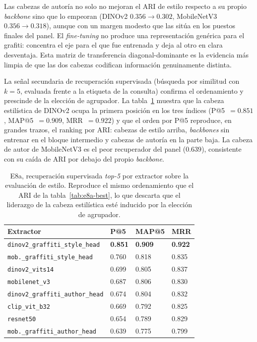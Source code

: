 Las cabezas de autoría no solo no mejoran el ARI de estilo respecto a su
propio \textit{backbone} sino que lo empeoran (DINOv2 $0.356\to 0.302$, MobileNetV3
$0.356\to 0.318$), aunque con un margen modesto que las sitúa en los puestos
finales del panel. El \textit{fine-tuning} no produce una representación
genérica para el grafiti: concentra el eje para el que fue entrenada y deja al
otro en clara desventaja. Esta matriz de transferencia diagonal-dominante es la
evidencia más limpia de que las dos cabezas codifican información genuinamente
distinta.

La señal secundaria de recuperación supervisada (búsqueda por similitud con
$k=5$, evaluada frente a la etiqueta de la consulta) confirma el ordenamiento
y prescinde de la elección de agrupador. La tabla~\ref{tab:e8a-retrieval}
muestra que la cabeza estilística de DINOv2 ocupa la primera posición en los
tres índices (P@5~$=0.851$, MAP@5~$=0.909$, MRR~$=0.922$) y que el orden por
P@5 reproduce, en grandes trazos, el ranking por ARI: cabezas de estilo
arriba, \textit{backbones} sin entrenar en el bloque intermedio y cabezas de
autoría en la parte baja. La cabeza de autor de MobileNetV3 es el peor
recuperador del panel ($0.639$), consistente con su caída de ARI por debajo
del propio \textit{backbone}.

\begin{table}[h]
  \centering
{\footnotesize
\begin{tabular}{|p{5.4cm}|p{1.3cm}|p{1.6cm}|p{1.3cm}|} \hline
  \textbf{Extractor} & \textbf{P@5} & \textbf{MAP@5} & \textbf{MRR} \\ \hline
  \texttt{dinov2\_graffiti\_style\_head}     & \textbf{0.851} & \textbf{0.909} & \textbf{0.922} \\ \hline
  \texttt{mob.\_graffiti\_style\_head}       & 0.760 & 0.818 & 0.835 \\ \hline
  \texttt{dinov2\_vits14}                    & 0.699 & 0.805 & 0.837 \\ \hline
  \texttt{mobilenet\_v3}                     & 0.687 & 0.806 & 0.830 \\ \hline
  \texttt{dinov2\_graffiti\_author\_head}    & 0.674 & 0.804 & 0.832 \\ \hline
  \texttt{clip\_vit\_b32}                    & 0.669 & 0.792 & 0.825 \\ \hline
  \texttt{resnet50}                          & 0.654 & 0.789 & 0.829 \\ \hline
  \texttt{mob.\_graffiti\_author\_head}      & 0.639 & 0.775 & 0.799 \\ \hline
\end{tabular}
}
  \caption[E8a, recuperación supervisada \textit{top-5} (estilo)]{E8a, recuperación supervisada \textit{top-5} por extractor sobre
  la evaluación de estilo. Reproduce el mismo ordenamiento que el ARI de la
  tabla~\ref{tab:e8a-best}, lo que descarta que el liderazgo de la cabeza
  estilística esté inducido por la elección de agrupador.}
  \label{tab:e8a-retrieval}
\end{table}

